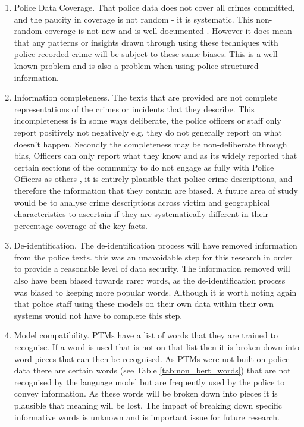 \begin{enumerate}
    
    \item Police Data Coverage. That police data does not cover all crimes committed, and the paucity in coverage is not random - it is systematic. This non-random coverage is not new and is well documented \parencite{Tarling}. However it does mean that any patterns or insights drawn through using these techniques with police recorded crime will be subject to these same biases. This is a well known problem and is also a problem when using police structured information.
    
    \item Information completeness. The texts that are provided are not complete representations of the crimes or incidents that they describe. This incompleteness is in some ways deliberate, the police officers or staff only report positively not negatively e.g. they do not generally report on what doesn't happen. Secondly the completeness may be non-deliberate through bias, Officers can only report what they know and as its widely reported that certain sections of the community to do not engage as fully with Police Officers as others \parencite{buil2021accuracy}, it is entirely plausible that police crime descriptions, and therefore the information that they contain are biased. A future area of study would be to analyse crime descriptions across victim and geographical characteristics to ascertain if they are systematically different in their percentage coverage of the key facts.
    
    \item De-identification. The de-identification process will have removed information from the police texts. this was an unavoidable step for this research in order to provide a reasonable level of data security. The information removed will also have been biased towards rarer words, as the de-identification process was biased to keeping more popular words. Although it is worth noting again that police staff using these models on their own data within their own systems would not have to complete this step.
    
    \item Model compatibility. PTMs have a list of words that they are trained to recognise. If a word is used that is not on that list then it is broken down into word pieces that can then be recognised. As PTMs were not built on police data there are certain words (see Table \ref{tab:non_bert_words}) that are not recognised by the language model but are frequently used by the police to convey information. As these words will be broken down into pieces it is plausible that meaning will be lost. The impact of breaking down specific informative words is unknown and is important issue for future research.
    
\end{enumerate}


